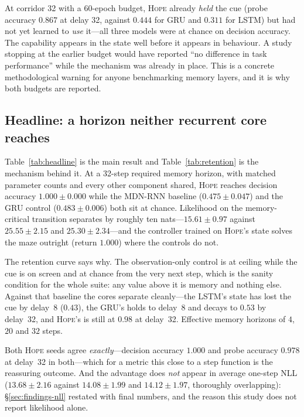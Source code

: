 \documentclass[11pt,a4paper]{article}
\begin{document}
At corridor 32 with a 60-epoch budget, \textsc{Hope} already \emph{held} the cue
(probe accuracy $0.867$ at delay 32, against $0.444$ for GRU and $0.311$ for
LSTM) but had not yet learned to \emph{use} it---all three models were at chance
on decision accuracy. The capability appears in the state well before it appears
in behaviour. A study stopping at the earlier budget would have reported ``no
difference in task performance'' while the mechanism was already in place. This
is a concrete methodological warning for anyone benchmarking memory layers, and
it is why both budgets are reported.

\subsection{Headline: a horizon neither recurrent core reaches}
\label{sec:headline}

Table~\ref{tab:headline} is the main result and Table~\ref{tab:retention} is the
mechanism behind it. At a 32-step required memory horizon, with matched parameter
counts and every other component shared, \textsc{Hope} reaches decision accuracy
$1.000\pm0.000$ while the MDN-RNN baseline ($0.475\pm0.047$) and the GRU control
($0.483\pm0.006$) both sit at chance. Likelihood on the memory-critical
transition separates by roughly ten nats---$15.61\pm0.97$ against $25.55\pm2.15$
and $25.30\pm2.34$---and the controller trained on \textsc{Hope}'s state solves
the maze outright (return $1.000$) where the controls do not.

The retention curve says why. The observation-only control is at ceiling while
the cue is on screen and at chance from the very next step, which is the sanity
condition for the whole suite: any value above it is memory and nothing else.
Against that baseline the cores separate cleanly---the LSTM's state has lost the
cue by delay~8 ($0.43$), the GRU's holds to delay~8 and decays to $0.53$ by
delay~32, and \textsc{Hope}'s is still at $0.98$ at delay~32. Effective memory
horizons of $4$, $20$ and $32$ steps.

Both \textsc{Hope} seeds agree \emph{exactly}---decision accuracy $1.000$ and
probe accuracy $0.978$ at delay~32 in both---which for a metric this close to a
step function is the reassuring outcome. And the advantage does \emph{not} appear
in average one-step NLL ($13.68\pm2.16$ against $14.08\pm1.99$ and
$14.12\pm1.97$, thoroughly overlapping): \S\ref{sec:findings-nll} restated with
final numbers, and the reason this study does not report likelihood alone.
\end{document}
